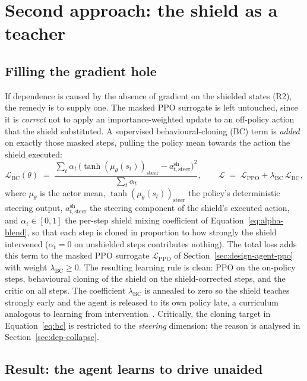 \section{Second approach: the shield as a teacher}\label{sec:dep-teacher}

\subsection{Filling the gradient hole}

If dependence is caused by the absence of gradient on the shielded states (R2), the remedy is to
supply one. The masked PPO surrogate is left untouched, since it is \emph{correct} not to apply an
importance-weighted update to an off-policy action that the shield substituted. A supervised
behavioural-cloning (BC) term is \emph{added} on exactly those masked steps, pulling the policy
mean towards the action the shield executed:
\begin{equation}\label{eq:bc}
  \mathcal{L}_{\mathrm{BC}}(\theta) \;=\;
  \frac{\sum_t \alpha_t\,\bigl(\tanh(\mu_\theta(s_t))_{\mathrm{steer}} - a^{\mathrm{sh}}_{t,\mathrm{steer}}\bigr)^2}
       {\sum_t \alpha_t},
  \qquad
  \mathcal{L} \;=\; \mathcal{L}_{\mathrm{PPO}} + \lambda_{\mathrm{BC}}\,\mathcal{L}_{\mathrm{BC}},
\end{equation}
where \(\mu_\theta\) is the actor mean, \(\tanh(\mu_\theta(s_t))_{\mathrm{steer}}\) the policy's
deterministic steering output, \(a^{\mathrm{sh}}_{t,\mathrm{steer}}\) the steering component of the
shield's executed action, and \(\alpha_t\in[0,1]\) the per-step shield mixing coefficient of
Equation~\eqref{eq:alpha-blend}, so that each step is cloned in proportion to how strongly the
shield intervened (\(\alpha_t = 0\) on unshielded steps contributes nothing). The total loss adds
this term to the masked PPO surrogate \(\mathcal{L}_{\mathrm{PPO}}\) of
Section~\ref{sec:design-agent-ppo} with weight \(\lambda_{\mathrm{BC}}\ge0\).
The resulting learning rule is clean: PPO on the on-policy steps, behavioural cloning of the
shield on the shield-corrected steps, and the critic on all steps. The coefficient
\(\lambda_{\mathrm{BC}}\) is annealed to zero so the shield teaches strongly early and the agent
is released to its own policy late, a curriculum analogous to learning from
intervention~\cite{ross2011dagger}. Critically, the cloning target in
Equation~\eqref{eq:bc} is restricted to the \emph{steering} dimension; the reason is analysed in
Section~\ref{sec:dep-collapse}.

\subsection{Result: the agent learns to drive unaided}

